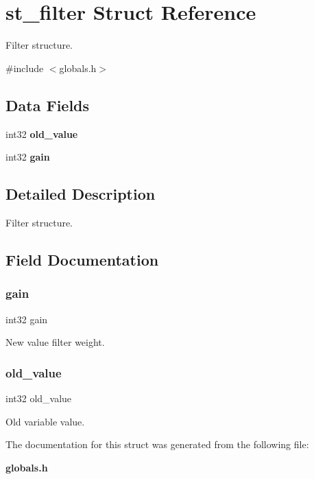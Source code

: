 \section{st\+\_\+filter Struct Reference}
\label{structst__filter}


Filter structure.  




{\ttfamily \#include $<$globals.\+h$>$}

\subsection*{Data Fields}
\begin{DoxyCompactItemize}
\item 
int32 \textbf{ old\+\_\+value}
\item 
int32 \textbf{ gain}
\end{DoxyCompactItemize}


\subsection{Detailed Description}
Filter structure. 



\subsection{Field Documentation}
\mbox{\label{structst__filter_a703aaefadcbbd3d1d771714f15c41b2a}} 
\subsubsection{gain}
{\footnotesize\ttfamily int32 gain}

New value filter weight. \mbox{\label{structst__filter_a80bc1645f2427aeb042cc33910f6a625}} 
\subsubsection{old\+\_\+value}
{\footnotesize\ttfamily int32 old\+\_\+value}

Old variable value. 

The documentation for this struct was generated from the following file\+:\begin{DoxyCompactItemize}
\item 
\textbf{ globals.\+h}\end{DoxyCompactItemize}
